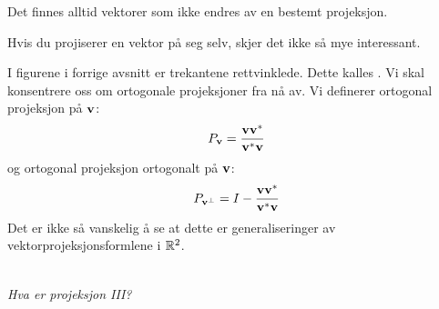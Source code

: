 \begin{fishythm}
Det finnes alltid vektorer som ikke endres av en bestemt projeksjon.
\end{fishythm}

\begin{merkx}
Hvis du projiserer en vektor på seg selv, skjer det ikke så mye interessant.
\end{merkx}


 
 I figurene i forrige avsnitt er trekantene rettvinklede. Dette kalles . 
 Vi skal konsentrere oss om ortogonale projeksjoner fra nå av.
 Vi definerer ortogonal projeksjon på $\mathbf{v}$:
 \[
 P_{\mathbf{v}}=\frac{\mathbf{v} \mathbf{v}^*}{\mathbf{v}^* \mathbf{v}}
 \]
 og ortogonal projeksjon ortogonalt på $\mathbf{v}$:
 \[
 P_{\mathbf{v}^{\perp}}=I-\frac{\mathbf{v} \mathbf{v}^*}{\mathbf{v}^* \mathbf{v}}
 \]
Det er ikke så vanskelig å se at dette er generaliseringer av vektorprojeksjonsformlene i $\mathbb{R}^2$.
 \begin{center}
\\
{\small \textit{Hva er projeksjon III?}}
\end{center}

